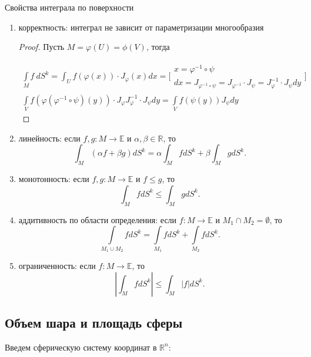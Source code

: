 \documentclass[a5paper]{article}
\theoremstyle{plain}
\theoremstyle{definition}
\numberwithin{through}{section}
\numberwithin{equation}{section}
\begin{document}
 
 Свойства интеграла по поверхности
 \begin{enumerate}
 	\item корректность: интеграл не зависит от параметризации многообразия
 	
 	\begin{proof}
 		Пусть $M = \varphi(U) = \phi(V)$, тогда
 		
 		\begin{align*}
 			\int\limits_M f\ dS^k = \int_U f(\varphi(x))\cdot J_\varphi (x)dx = \bigg[ 
 			\begin{array}{c}
 				x = \varphi^{-1} \circ \psi \\
 				dx = J_{\varphi^{-1} \circ \psi} = J_{\varphi^{-1}} \cdot J_{\psi} = J^{-1}_{\varphi} \cdot J_{\psi} dy
 			\end{array}
 			\bigg] \\ \int\limits_{V} f(\varphi(\varphi^{-1} \circ \psi)(y)) \cdot J_\varphi J^{-1}_{\varphi} \cdot J_{\psi} dy = \int\limits_{V} f(\psi(y)) J_{\psi} dy
 		\end{align*}
 	\end{proof} 
 		
 	\item 
 	линейность: если $f, g: M \to \mathbb{E}$ и $\alpha, \beta \in \mathbb{R}$, то 
 	\[ \int_M (\alpha f + \beta g) dS^k = \alpha \int_M f dS^k + 
 	\beta\int_M g dS^k. \]
 	
 	\item 
 	монотонность: если $f, g: M \to \mathbb{E}$ и $f \leq g$, то
 	\[ \int_M f dS^k \leq \int_M g dS^k. \]
 	
 	\item
 	аддитивность по области определения: если $f: M \to \mathbb{E}$ 
 	и $M_1 \cap M_2 = \emptyset$, то 
 	\[ \underset{M_1 \cup M_2}{\int} f dS^k = 
 	\underset{M_1}{\int} f dS^k +\underset{M_2}{\int}  f dS^k. \]
 	
 	\item 
 	ограниченность: если $f: M \to \mathbb{E}$, то
 	\[ \left| \int_M f dS^k \right| \leq \int_M |f| dS^k.  \]
 	
 \end{enumerate}

\subsection{Объем шара и площадь сферы} %

Введем сферическую систему координат в $\mathbb{R}^n$:
\end{document}
